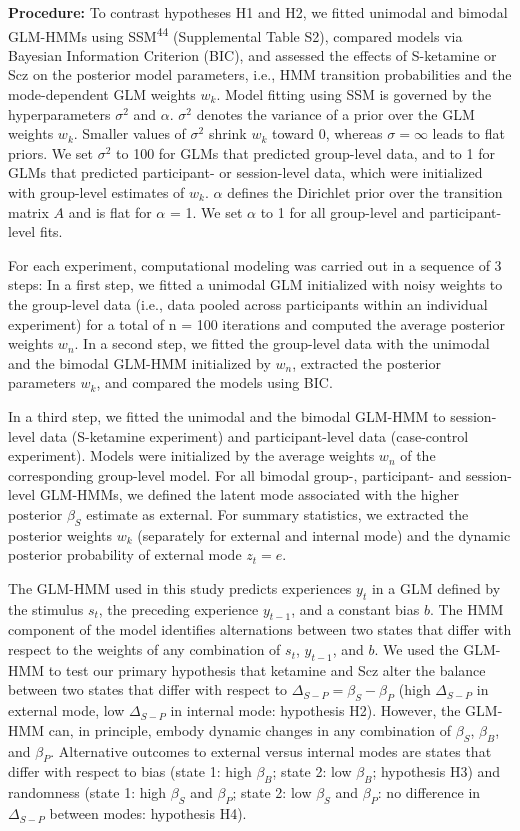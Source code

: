 \documentclass[
]{article}
\begin{document}
\textbf{Procedure:} To contrast hypotheses H1 and H2, we fitted unimodal
and bimodal GLM-HMMs using SSM\textsuperscript{44} (Supplemental Table
S2), compared models via Bayesian Information Criterion (BIC), and
assessed the effects of S-ketamine or Scz on the posterior model
parameters, i.e., HMM transition probabilities and the mode-dependent
GLM weights \(w_k\). Model fitting using SSM is governed by the
hyperparameters \(\sigma^2\) and \(\alpha\). \(\sigma^2\) denotes the
variance of a prior over the GLM weights \(w_k\). Smaller values of
\(\sigma^2\) shrink \(w_k\) toward 0, whereas \(\sigma = \infty\) leads
to flat priors. We set \(\sigma^2\) to 100 for GLMs that predicted
group-level data, and to 1 for GLMs that predicted participant- or
session-level data, which were initialized with group-level estimates of
\(w_k\). \(\alpha\) defines the Dirichlet prior over the transition
matrix \(A\) and is flat for \(\alpha\) = 1. We set \(\alpha\) to 1 for
all group-level and participant-level fits.

For each experiment, computational modeling was carried out in a
sequence of 3 steps: In a first step, we fitted a unimodal GLM
initialized with noisy weights to the group-level data (i.e., data
pooled across participants within an individual experiment) for a total
of n = 100 iterations and computed the average posterior weights
\(w_n\). In a second step, we fitted the group-level data with the
unimodal and the bimodal GLM-HMM initialized by \(w_n\), extracted the
posterior parameters \(w_k\), and compared the models using BIC.

In a third step, we fitted the unimodal and the bimodal GLM-HMM to
session-level data (S-ketamine experiment) and participant-level data
(case-control experiment). Models were initialized by the average
weights \(w_n\) of the corresponding group-level model. For all bimodal
group-, participant- and session-level GLM-HMMs, we defined the latent
mode associated with the higher posterior \(\beta_S\) estimate as
external. For summary statistics, we extracted the posterior weights
\(w_k\) (separately for external and internal mode) and the dynamic
posterior probability of external mode \(z_t = e\).

The GLM-HMM used in this study predicts experiences \(y_t\) in a GLM
defined by the stimulus \(s_t\), the preceding experience \(y_{t-1}\),
and a constant bias \(b\). The HMM component of the model identifies
alternations between two states that differ with respect to the weights
of any combination of \(s_t\), \(y_{t-1}\), and \(b\). We used the
GLM-HMM to test our primary hypothesis that ketamine and Scz alter the
balance between two states that differ with respect to
\(\Delta_{S-P} = \beta_S - \beta_P\) (high \(\Delta_{S-P}\) in external
mode, low \(\Delta_{S-P}\) in internal mode: hypothesis H2). However,
the GLM-HMM can, in principle, embody dynamic changes in any combination
of \(\beta_S\), \(\beta_B\), and \(\beta_P\). Alternative outcomes to
external versus internal modes are states that differ with respect to
bias (state 1: high \(\beta_B\); state 2: low \(\beta_B\); hypothesis
H3) and randomness (state 1: high \(\beta_S\) and \(\beta_P\); state 2:
low \(\beta_S\) and \(\beta_P\): no difference in \(\Delta_{S-P}\)
between modes: hypothesis H4).
\end{document}
